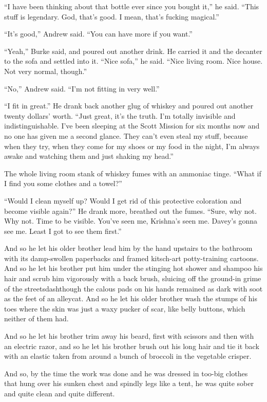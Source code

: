``I have been thinking about that bottle ever since you bought it,''
he said.  ``This stuff is legendary.  God, that's good.  I mean,
that's fucking magical.''

``It's good,'' Andrew said.  ``You can have more if you want.''

``Yeah,'' Burke said, and poured out another drink.  He carried it and
the decanter to the sofa and settled into it.  ``Nice sofa,'' he said. 
``Nice living room.  Nice house.  Not very normal, though.''

``No,'' Andrew said.  ``I'm not fitting in very well.''

``I fit in great.'' He drank back another glug of whiskey and poured
out another twenty dollars' worth.  ``Just great, it's the truth.  I'm
totally invisible and indistinguishable.  I've been sleeping at the
Scott Mission for six months now and no one has given me a second
glance.  They can't even steal my stuff, because when they try, when
they come for my shoes or my food in the night, I'm always awake and
watching them and just shaking my head.''

The whole living room stank of whiskey fumes with an ammoniac tinge. 
``What if I find you some clothes and a towel?''

``Would I clean myself up?  Would I get rid of this protective
coloration and become visible again?'' He drank more, breathed out the
fumes.  ``Sure, why not.  Why not.  Time to be visible.  You've seen
me, Krishna's seen me.  Davey's gonna see me.  Least I got to see them
first.''

And so he let his older brother lead him by the hand upstairs to the
bathroom with its damp-swollen paperbacks and framed kitsch-art
potty-training cartoons.  And so he let his brother put him under the
stinging hot shower and shampoo his hair and scrub him vigorously with
a back brush, sluicing off the ground-in grime of the streetsdash{}though
the calous pads on his hands remained as dark with soot as the feet of
an alleycat.  And so he let his older brother wash the stumps of his
toes where the skin was just a waxy pucker of scar, like belly
buttons, which neither of them had.

And so he let his brother trim away his beard, first with scissors and
then with an electric razor, and so he let his brother brush out his
long hair and tie it back with an elastic taken from around a bunch of
broccoli in the vegetable crisper.

And so, by the time the work was done and he was dressed in too-big
clothes that hung over his sunken chest and spindly legs like a tent,
he was quite sober and quite clean and quite different.

